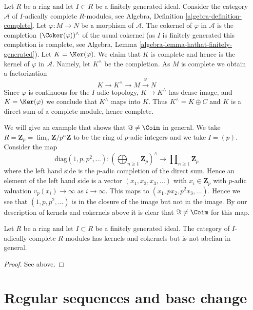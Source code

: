 \noindent
Let $R$ be a ring and let $I \subset R$ be a finitely generated ideal.
Consider the category $\mathcal{A}$ of $I$-adically complete
$R$-modules, see
Algebra, Definition \ref{algebra-definition-complete}.
Let $\varphi : M \to N$ be a morphism of $\mathcal{A}$.
The cokernel of $\varphi$ in $\mathcal{A}$ is the completion
$(\Coker(\varphi))^\wedge$ of the usual cokernel
(as $I$ is finitely generated this completion is complete, see
Algebra, Lemma \ref{algebra-lemma-hathat-finitely-generated}).
Let $K = \Ker(\varphi)$. We claim that $K$ is complete and
hence is the kernel of $\varphi$ in $\mathcal{A}$. Namely, let
$K^\wedge$ be the completion. As $M$ is complete we obtain a factorization
$$
K \to K^\wedge \to M \xrightarrow{\varphi} N
$$
Since $\varphi$ is continuous for the $I$-adic topology, $K \to K^\wedge$
has dense image, and $K = \Ker(\varphi)$ we conclude that $K^\wedge$
maps into $K$. Thus $K^\wedge = K \oplus C$ and $K$ is a direct sum
of a complete module, hence complete.

\medskip\noindent
We will give an example that shows that $\Im \not = \Coim$
in general. We take $R = \mathbf{Z}_p = \lim_n \mathbf{Z}/p^n\mathbf{Z}$
to be the ring of $p$-adic integers and we take $I = (p)$.
Consider the map
$$
\text{diag}(1, p, p^2, \ldots) :
\left(\bigoplus\nolimits_{n \geq 1} \mathbf{Z}_p\right)^\wedge
\longrightarrow
\prod\nolimits_{n \geq 1} \mathbf{Z}_p
$$
where the left hand side is the $p$-adic completion of the direct sum.
Hence an element of the left hand side is a vector $(x_1, x_2, x_3, \ldots)$
with $x_i \in \mathbf{Z}_p$ with $p$-adic valuation $v_p(x_i) \to \infty$ as
$i \to \infty$. This maps to $(x_1, px_2, p^2x_3, \ldots)$. Hence we see
that $(1, p, p^2, \ldots)$ is in the closure of the image but not in
the image. By our description of kernels and cokernels above it is
clear that $\Im \not = \Coim$ for this map.

\begin{lemma}
\label{lemma-complete-modules-not-abelian}
Let $R$ be a ring and let $I \subset R$ be a finitely generated ideal.
The category of $I$-adically complete $R$-modules has kernels and
cokernels but is not abelian in general.
\end{lemma}

\begin{proof}
See above.
\end{proof}


\section{Regular sequences and base change}
\label{section-regular-base-change}

